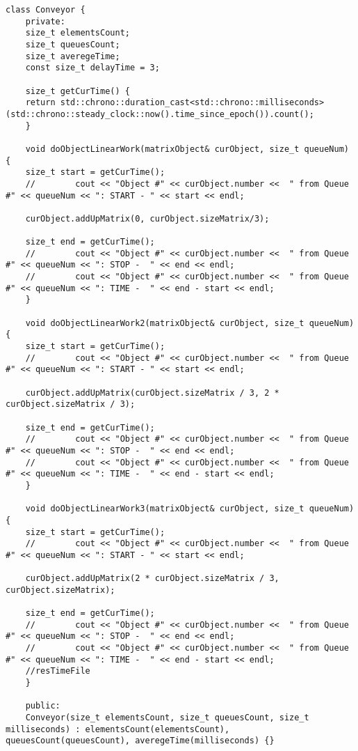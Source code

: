 \documentclass[12pt, a4paper]{report}
\begin{document}
	\begin{lstlisting}[label=code:conveyor,caption=Реализация линейной и конвейерной обработки матрицы]
	class Conveyor {
	private:
	size_t elementsCount;
	size_t queuesCount;
	size_t averegeTime;
	const size_t delayTime = 3;
	
	size_t getCurTime() {
	return std::chrono::duration_cast<std::chrono::milliseconds>(std::chrono::steady_clock::now().time_since_epoch()).count();
	}
	
	void doObjectLinearWork(matrixObject& curObject, size_t queueNum) {
	size_t start = getCurTime();
	//        cout << "Object #" << curObject.number <<  " from Queue #" << queueNum << ": START - " << start << endl;
	
	curObject.addUpMatrix(0, curObject.sizeMatrix/3);
	
	size_t end = getCurTime();
	//        cout << "Object #" << curObject.number <<  " from Queue #" << queueNum << ": STOP -  " << end << endl;
	//        cout << "Object #" << curObject.number <<  " from Queue #" << queueNum << ": TIME -  " << end - start << endl;
	}
	
	void doObjectLinearWork2(matrixObject& curObject, size_t queueNum) {
	size_t start = getCurTime();
	//        cout << "Object #" << curObject.number <<  " from Queue #" << queueNum << ": START - " << start << endl;
	
	curObject.addUpMatrix(curObject.sizeMatrix / 3, 2 * curObject.sizeMatrix / 3);
	
	size_t end = getCurTime();
	//        cout << "Object #" << curObject.number <<  " from Queue #" << queueNum << ": STOP -  " << end << endl;
	//        cout << "Object #" << curObject.number <<  " from Queue #" << queueNum << ": TIME -  " << end - start << endl;
	}
	
	void doObjectLinearWork3(matrixObject& curObject, size_t queueNum) {
	size_t start = getCurTime();
	//        cout << "Object #" << curObject.number <<  " from Queue #" << queueNum << ": START - " << start << endl;
	
	curObject.addUpMatrix(2 * curObject.sizeMatrix / 3, curObject.sizeMatrix);
	
	size_t end = getCurTime();
	//        cout << "Object #" << curObject.number <<  " from Queue #" << queueNum << ": STOP -  " << end << endl;
	//        cout << "Object #" << curObject.number <<  " from Queue #" << queueNum << ": TIME -  " << end - start << endl;
	//resTimeFile
	}
	
	public:
	Conveyor(size_t elementsCount, size_t queuesCount, size_t milliseconds) : elementsCount(elementsCount), queuesCount(queuesCount), averegeTime(milliseconds) {}
	

\end{lstlisting}
\end{document}
